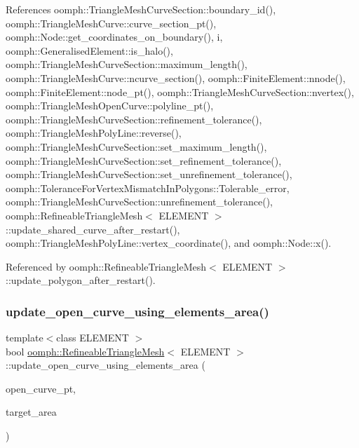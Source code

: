 References oomph\+::\+Triangle\+Mesh\+Curve\+Section\+::boundary\+\_\+id(), oomph\+::\+Triangle\+Mesh\+Curve\+::curve\+\_\+section\+\_\+pt(), oomph\+::\+Node\+::get\+\_\+coordinates\+\_\+on\+\_\+boundary(), i, oomph\+::\+Generalised\+Element\+::is\+\_\+halo(), oomph\+::\+Triangle\+Mesh\+Curve\+Section\+::maximum\+\_\+length(), oomph\+::\+Triangle\+Mesh\+Curve\+::ncurve\+\_\+section(), oomph\+::\+Finite\+Element\+::nnode(), oomph\+::\+Finite\+Element\+::node\+\_\+pt(), oomph\+::\+Triangle\+Mesh\+Curve\+Section\+::nvertex(), oomph\+::\+Triangle\+Mesh\+Open\+Curve\+::polyline\+\_\+pt(), oomph\+::\+Triangle\+Mesh\+Curve\+Section\+::refinement\+\_\+tolerance(), oomph\+::\+Triangle\+Mesh\+Poly\+Line\+::reverse(), oomph\+::\+Triangle\+Mesh\+Curve\+Section\+::set\+\_\+maximum\+\_\+length(), oomph\+::\+Triangle\+Mesh\+Curve\+Section\+::set\+\_\+refinement\+\_\+tolerance(), oomph\+::\+Triangle\+Mesh\+Curve\+Section\+::set\+\_\+unrefinement\+\_\+tolerance(), oomph\+::\+Tolerance\+For\+Vertex\+Mismatch\+In\+Polygons\+::\+Tolerable\+\_\+error, oomph\+::\+Triangle\+Mesh\+Curve\+Section\+::unrefinement\+\_\+tolerance(), oomph\+::\+Refineable\+Triangle\+Mesh$<$ E\+L\+E\+M\+E\+N\+T $>$\+::update\+\_\+shared\+\_\+curve\+\_\+after\+\_\+restart(), oomph\+::\+Triangle\+Mesh\+Poly\+Line\+::vertex\+\_\+coordinate(), and oomph\+::\+Node\+::x().



Referenced by oomph\+::\+Refineable\+Triangle\+Mesh$<$ E\+L\+E\+M\+E\+N\+T $>$\+::update\+\_\+polygon\+\_\+after\+\_\+restart().

\mbox{\label{classoomph_1_1RefineableTriangleMesh_a75a9af063616474dc96e951b5a3025b9}} 
\subsubsection{\texorpdfstring{update\+\_\+open\+\_\+curve\+\_\+using\+\_\+elements\+\_\+area()}{update\_open\_curve\_using\_elements\_area()}}
{\footnotesize\ttfamily template$<$class E\+L\+E\+M\+E\+NT $>$ \\
bool \hyperlink{classoomph_1_1RefineableTriangleMesh}{oomph\+::\+Refineable\+Triangle\+Mesh}$<$ E\+L\+E\+M\+E\+NT $>$\+::update\+\_\+open\+\_\+curve\+\_\+using\+\_\+elements\+\_\+area (\begin{DoxyParamCaption}\item[{\hyperlink{classoomph_1_1TriangleMeshOpenCurve}{Triangle\+Mesh\+Open\+Curve} $\ast$\&}]{open\+\_\+curve\+\_\+pt,  }\item[{const \hyperlink{classoomph_1_1Vector}{Vector}$<$ double $>$ \&}]{target\+\_\+area }\end{DoxyParamCaption})\hspace{0.3cm}{\ttfamily [protected]}}



